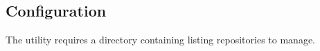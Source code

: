 
\subsection{Configuration}
The  utility requires a  directory containing
 listing repositories to manage.


